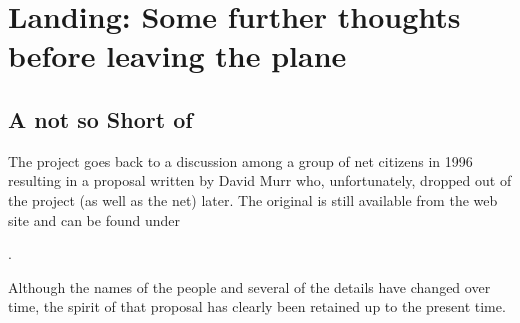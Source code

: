 
\chapter{Landing: Some further thoughts before leaving the plane\label{landing}}


\section{A not so Short  of \FlightGear{}}
The \FlightGear{} project goes back to a discussion among a group of net citizens in 1996 resulting in
a proposal written by David Murr who, unfortunately, dropped out of
the project (as well as the net) later. The original  is still available
from the \FlightGear{} web site and can be found under
 \medskip

.
 \medskip

\noindent
 Although the names of the people and several of the details have changed over time,
the spirit of that proposal has clearly been retained up to the present time.

